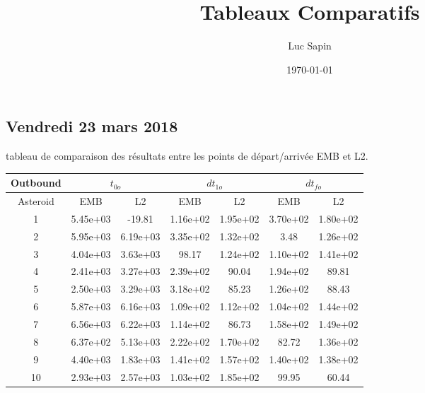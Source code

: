 \documentclass[fleqn,%
a4paper,11pt]{scrbook}
\title{Tableaux Comparatifs}
\author{Luc Sapin}
\date{\today}
\begin{document}
\maketitle
\chapter*{}
\label{cha:cr-reu}
\section*{Vendredi 23 mars 2018}
tableau de comparaison des résultats entre les points de départ/arrivée EMB et L2.\\


\begin{tabular}{|c||c|c||c|c||c|c|}
	\hline
	\textbf{Outbound} & \multicolumn{2}{c||}{$t_{0o}$} &  \multicolumn{2}{c||}{$dt_{1o}$} & \multicolumn{2}{c|}{$dt_{fo}$} \\
	\hline
	Asteroid & EMB & L2 & EMB & L2 & EMB & L2 \\
	\hline
	1 & 5.45e+03 & -19.81 & 1.16e+02 & 1.95e+02 & 3.70e+02 & 1.80e+02 \\
	\hline
	2 & 5.95e+03 & 6.19e+03 & 3.35e+02 & 1.32e+02 & 3.48 & 1.26e+02 \\
	\hline
	3 & 4.04e+03 & 3.63e+03 & 98.17 & 1.24e+02 & 1.10e+02 & 1.41e+02 \\
	\hline
	4 & 2.41e+03 & 3.27e+03 & 2.39e+02 & 90.04 & 1.94e+02 & 89.81 \\
	\hline
	5 & 2.50e+03 & 3.29e+03 & 3.18e+02 & 85.23 & 1.26e+02 & 88.43 \\
	\hline
	6 & 5.87e+03 & 6.16e+03 & 1.09e+02 & 1.12e+02 & 1.04e+02 & 1.44e+02 \\
	\hline
	7 & 6.56e+03 & 6.22e+03 & 1.14e+02 & 86.73 & 1.58e+02 & 1.49e+02 \\
	\hline
	8 & 6.37e+02 & 5.13e+03 & 2.22e+02 & 1.70e+02 & 82.72 & 1.36e+02 \\
	\hline
	9 & 4.40e+03 & 1.83e+03 & 1.41e+02 & 1.57e+02 & 1.40e+02 & 1.38e+02 \\
	\hline
	10 & 2.93e+03 & 2.57e+03 & 1.03e+02 & 1.85e+02 & 99.95 & 60.44 \\
	\hline
\end{tabular}
\end{document}
